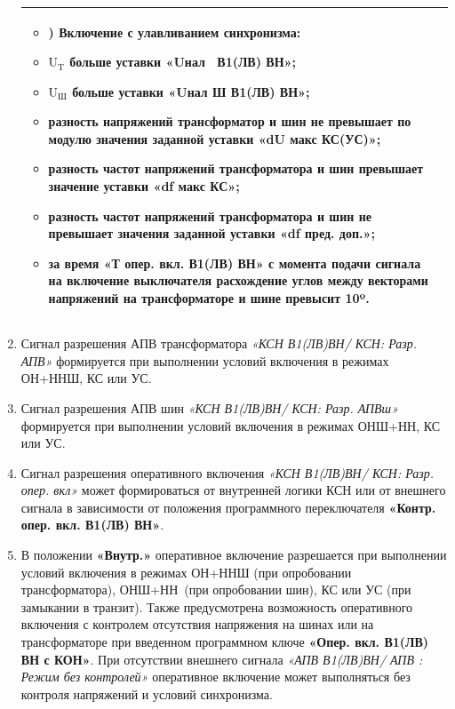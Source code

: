 \begin{enumerate}
\begin{longtable}{|>{\centering\arraybackslash}m{5.3cm}|>{\centering\arraybackslash}m{11.6cm}|}
			\begin{itemize}
			\item[] \noindent  2) Включение с улавливанием синхронизма:
			\item $ \text{U}_\text{T} $ больше уставки \textbf{«Uнал \TypeTr~В1(ЛВ) ВН»};
			\item $ \text{U}_\text{Ш} $ больше уставки \textbf{«Uнал Ш В1(ЛВ) ВН»};
			\item разность напряжений трансформатор и шин не превышает по модулю значения заданной уставки \textbf{«dU макс КС(УС)»};
			\item разность частот напряжений трансформатора и шин превышает значение уставки \textbf{«df макс КС»};
			\item разность частот напряжений трансформатора и шин не превышает значения заданной уставки \textbf{«df пред. доп.»};
			\item за время \textbf{«Т опер. вкл. В1(ЛВ) ВН»} с момента подачи сигнала на включение выключателя расхождение углов между векторами напряжений на трансформаторе и шине превысит 10º.
			\vspace{3pt}
			\end{itemize} \\
\hline

\end{longtable}
\normalsize	

\item
Сигнал разрешения АПВ трансформатора \textit{«КСН В1(ЛВ)ВН/ КСН: Разр. АПВ\TypeSm»} формируется при выполнении условий включения в режимах ОН\TypeTr+ННШ, КС или УС. 

\item
Сигнал разрешения АПВ шин \textit{«КСН В1(ЛВ)ВН/ КСН: Разр. АПВш»} формируется при выполнении условий включения в режимах ОНШ+НН\TypeTr, КС или УС. 

\item
Сигнал разрешения оперативного включения \textit{«КСН В1(ЛВ)ВН/ КСН: Разр. опер. вкл»} может формироваться от внутренней логики КСН или от внешнего сигнала в зависимости от положения программного переключателя \textbf{«Контр. опер. вкл. В1(ЛВ) ВН»}.

\item
В положении \textbf{«Внутр.»} оперативное включение разрешается при выполнении условий включения в режимах ОН\TypeTr+ННШ (при опробовании трансформатора), ОНШ+НН\TypeTr~(при опробовании шин), КС или УС (при замыкании в транзит). Также предусмотрена возможность оперативного включения с контролем отсутствия напряжения на шинах или на трансформаторе при введенном программном ключе \textbf{«Опер. вкл. В1(ЛВ) ВН с КОН»}. При отсутствии внешнего сигнала \textit{«АПВ В1(ЛВ)ВН/ АПВ \TypeTr : Режим без контролей»}  оперативное включение может выполняться без контроля напряжений и условий синхронизма.


\end{enumerate}
